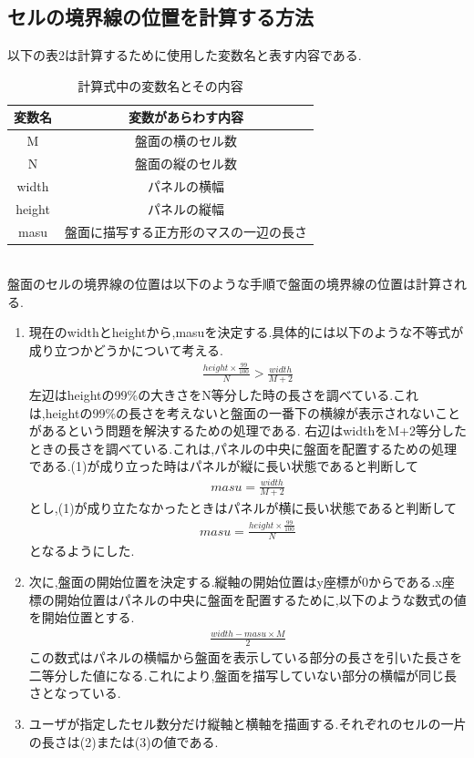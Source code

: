 \documentclass[dvipdfmx]{jarticle}
\begin{document}
\subsection{セルの境界線の位置を計算する方法}
以下の表2は計算するために使用した変数名と表す内容である.
\begin{table}[h]
\centering
\begin{tabular}{|c||c|}
    \hline
    変数名 & 変数があらわす内容\\
    \hline\hline
    M & 盤面の横のセル数\\\hline
    N & 盤面の縦のセル数\\\hline
    width & パネルの横幅\\\hline
    height & パネルの縦幅\\\hline
    masu & 盤面に描写する正方形のマスの一辺の長さ\\\hline
\end{tabular}
\caption{計算式中の変数名とその内容}
\end{table}
\\盤面のセルの境界線の位置は以下のような手順で盤面の境界線の位置は計算される.
\begin{enumerate}
    \item 現在のwidthとheightから,masuを決定する.具体的には以下のような不等式が成り立つかどうかについて考える.
    \begin{align}
        \frac{height\times\frac{99}{100}}{N} > \frac{width}{M+2}
    \end{align}
    左辺はheightの99\%の大きさをN等分した時の長さを調べている.これは,heightの99\%の長さを考えないと盤面の一番下の横線が表示されないことがあるという問題を解決するための処理である.
    右辺はwidthをM+2等分したときの長さを調べている.これは,パネルの中央に盤面を配置するための処理である.(1)が成り立った時はパネルが縦に長い状態であると判断して
    \begin{align}
        masu=\frac{width}{M+2}
    \end{align}
    とし,(1)が成り立たなかったときはパネルが横に長い状態であると判断して
    \begin{align}
        masu = \frac{height\times\frac{99}{100}}{N}
    \end{align}
    となるようにした.
    \item 次に,盤面の開始位置を決定する.縦軸の開始位置はy座標が0からである.x座標の開始位置はパネルの中央に盤面を配置するために,以下のような数式の値を開始位置とする.
    \begin{align}
        \frac{width-masu\times M}{2}
    \end{align}
    この数式はパネルの横幅から盤面を表示している部分の長さを引いた長さを二等分した値になる.これにより,盤面を描写していない部分の横幅が同じ長さとなっている.
    \item ユーザが指定したセル数分だけ縦軸と横軸を描画する.それぞれのセルの一片の長さは(2)または(3)の値である.
\end{enumerate}
\end{document}
